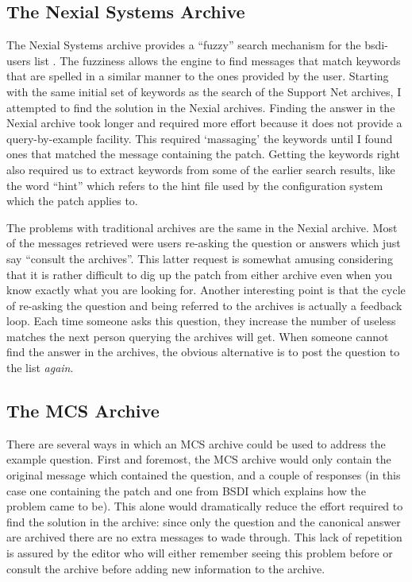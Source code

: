 \subsection{The Nexial Systems Archive}
The Nexial Systems archive provides a ``fuzzy'' search mechanism for the
bsdi-users list \cite{nexial-bsdi}. The fuzziness allows the engine to find
messages that match keywords that are spelled in a similar manner to the ones
provided by the user. Starting with the same initial set of keywords as the
search of the Support Net archives, I attempted to find the solution in the
Nexial archives. Finding the answer in the Nexial archive took longer and
required more effort because it does not provide a query-by-example facility.
This required `massaging' the keywords until I found ones that matched the
message containing the patch. Getting the keywords right also required us to
extract keywords from some of the earlier search results, like the word
``hint'' which refers to the hint file used by the configuration system which
the patch applies to.

The problems with traditional archives are the same in the Nexial archive. Most 
of the messages retrieved were users re-asking the question or answers which
just say ``consult the archives''. This latter request is somewhat amusing
considering that it is rather difficult to dig up the patch from either archive 
even when you know exactly what you are looking for. Another interesting point
is that the cycle of re-asking the question and being referred to the archives
is actually a feedback loop. Each time someone asks this question, they
increase the number of useless matches the next person querying the archives
will get. When someone cannot find the answer in the archives, the obvious
alternative is to post the question to the list {\em again}.

\subsection{The MCS Archive}
\label{sec:mcs-symptom-example}
There are several ways in which an MCS archive could be used to address the
example question. First and foremost, the MCS archive would only contain the
original message which contained the question, and a couple of responses (in
this case one containing the patch and one from BSDI which explains how the
problem came to be). This alone would dramatically reduce the effort required
to find the solution in the archive: since only the question and the canonical
answer are archived there are no extra messages to wade through. This lack of
repetition is assured by the editor who will either remember seeing this
problem before or consult the archive before adding new information to the
archive.

